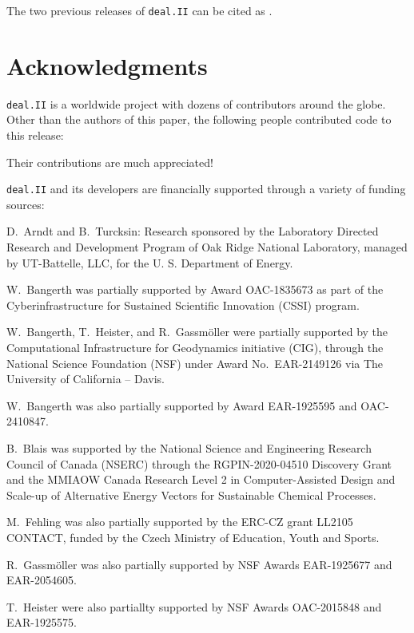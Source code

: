 \documentclass{ansarticle-preprint}
\newcommand{\specialword}[1]{\texttt{#1}}
\newcommand{\dealii}{{\specialword{deal.II}}\xspace}
\begin{document}
The two previous releases of \dealii can be cited as
\cite{dealII95,dealII96}.


\section{Acknowledgments}

\dealii is a worldwide project with dozens of contributors around the
globe. Other than the authors of this paper, the following people
contributed code to this release:\\

\begin{quote}
\end{quote}
Their contributions are much appreciated!


\bigskip

\dealii and its developers are financially supported through a
variety of funding sources:

D.~Arndt and B.~Turcksin: Research sponsored by the Laboratory Directed Research and
Development Program of Oak Ridge National Laboratory, managed by UT-Battelle,
LLC, for the U. S. Department of Energy.

W.~Bangerth was partially supported by Award OAC-1835673
as part of the Cyberinfrastructure for Sustained Scientific Innovation (CSSI)
program.

W.~Bangerth, T.~Heister, and R.~Gassm\"{o}ller were partially
supported by the Computational Infrastructure for Geodynamics initiative
(CIG), through the National Science Foundation (NSF) under Award
No.~EAR-2149126 via The University of California -- Davis.

W.~Bangerth was also partially supported by Award EAR-1925595 and OAC-2410847.

B.~Blais was supported by the National Science and Engineering Research Council of Canada (NSERC)  through the RGPIN-2020-04510 Discovery Grant and the MMIAOW Canada Research Level 2 in Computer-Assisted Design and Scale-up of Alternative Energy Vectors for Sustainable Chemical Processes.

M.~Fehling was also partially supported by the ERC-CZ grant LL2105
CONTACT, funded by the Czech Ministry of Education, Youth and Sports.

R.~Gassm\"{o}ller was also partially supported by NSF Awards EAR-1925677
and EAR-2054605.

T.~Heister were also partiallty supported by NSF Awards OAC-2015848 and EAR-1925575.
\end{document}
